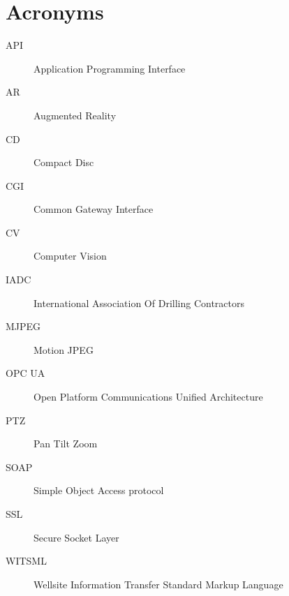\documentclass[main.tex]{subfiles}
\begin{document}
\chapter{Acronyms}
\begin{description}
\item[API] Application Programming Interface
\item[AR] Augmented Reality
\item[CD] Compact Disc
\item[CGI] Common Gateway Interface
\item[CV] Computer Vision
\item[IADC] International Association Of Drilling Contractors
\item[MJPEG] Motion JPEG
\item[OPC UA] Open Platform Communications Unified Architecture
\item[PTZ] Pan Tilt Zoom
\item[SOAP] Simple Object Access protocol
\item[SSL] Secure Socket Layer
\item[WITSML] Wellsite Information Transfer Standard Markup Language

\end{description}
\end{document}
